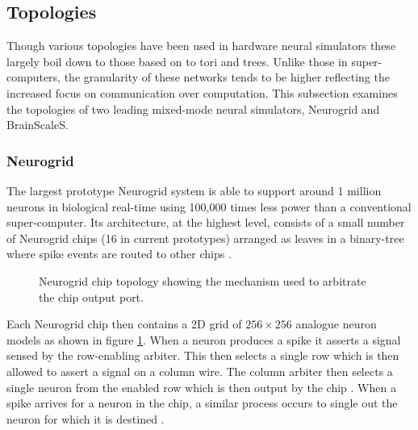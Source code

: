 		\subsection{Topologies}
			
			
			Though various topologies have been used in hardware neural simulators
			these largely boil down to those based on to tori and trees. Unlike those
			in super-computers, the granularity of these networks tends to be higher
			reflecting the increased focus on communication over computation.  This
			subsection examines the topologies of two leading mixed-mode neural
			simulators, Neurogrid and BrainScaleS.
			
			\subsubsection{Neurogrid}
				
				
				The largest prototype Neurogrid system is able to support around 1
				million neurons in biological real-time using 100,000 times less power
				than a conventional super-computer. Its architecture, at the highest
				level, consists of a small number of Neurogrid chips  (16 in current
				prototypes) arranged as leaves in a binary-tree where spike events are
				routed to other chips \cite{choudhary12}.
				
				\begin{figure}
					\center
					
					\caption[Neurogrid chip topology.]{Neurogrid chip topology showing the
					mechanism used to arbitrate the chip output port.}
					\label{fig:neurogrid-chip}
				\end{figure}
				
				Each Neurogrid chip then contains a 2D grid of $256\times256$ analogue
				neuron models as shown in figure \ref{fig:neurogrid-chip}. When a neuron
				produces a spike it asserts a signal sensed by the row-enabling arbiter.
				This then selects a single row which is then allowed to assert a signal
				on a column wire. The column arbiter then selects a single neuron from
				the enabled row which is then output by the chip \cite{boahen04}. When a
				spike arrives for a neuron in the chip, a similar process occurs to
				single out the neuron for which it is destined \cite{boahen04receiver}.
				
